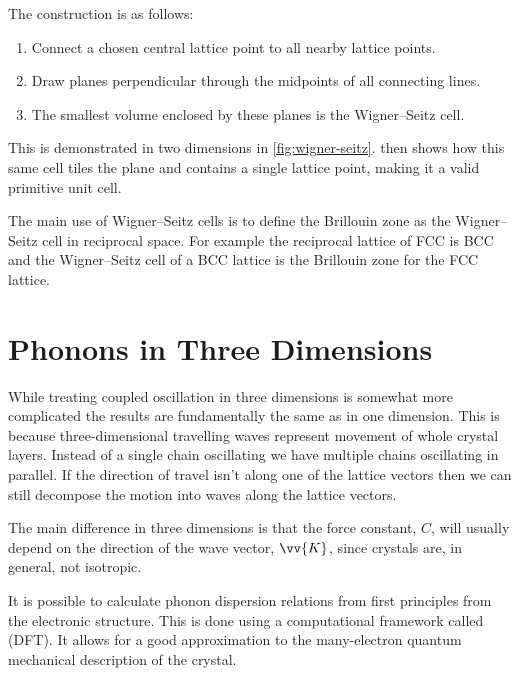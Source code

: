 \documentclass[fleqn]{NotesClass}
\begin{document}
    The construction is as follows:
    \begin{enumerate}
        \item Connect a chosen central lattice point to all nearby lattice points.
        \item Draw planes perpendicular through the midpoints of all connecting lines.
        \item The smallest volume enclosed by these planes is the Wigner--Seitz cell.
    \end{enumerate}
    This is demonstrated in two dimensions in \cref{fig:wigner-seitz}.
     then shows how this same cell tiles the plane and contains a single lattice point, making it a valid primitive unit cell.
    
    The main use of Wigner--Seitz cells is to define the Brillouin zone as the Wigner--Seitz cell in reciprocal space.
    For example the reciprocal lattice of FCC is BCC and the Wigner--Seitz cell of a BCC lattice is the Brillouin zone for the FCC lattice.
    
    \section{Phonons in Three Dimensions}
    While treating coupled oscillation in three dimensions is somewhat more complicated the results are fundamentally the same as in one dimension.
    This is because three-dimensional travelling waves represent movement of whole crystal layers.
    Instead of a single chain oscillating we have multiple chains oscillating in parallel.
    If the direction of travel isn't along one of the lattice vectors then we can still decompose the motion into waves along the lattice vectors.
    
    The main difference in three dimensions is that the force constant, \(C\), will usually depend on the direction of the wave vector, \(\vv{K}\), since crystals are, in general, not isotropic.
    
    It is possible to calculate phonon dispersion relations from first principles from the electronic structure.
    This is done using a computational framework called  (DFT).
    It allows for a good approximation to the many-electron quantum mechanical description of the crystal.
    
\end{document}

